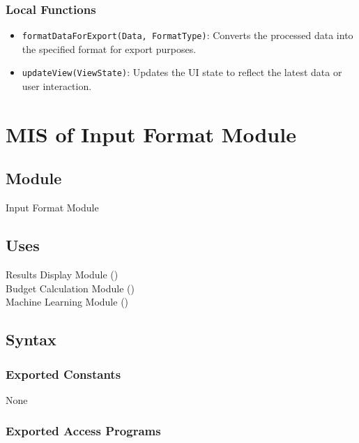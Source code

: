 \documentclass[12pt, titlepage]{article}
\begin{document}
\subsubsection{Local Functions}

\begin{itemize}
    \item \texttt{formatDataForExport(Data, FormatType)}: Converts the processed data into the specified format for export purposes.
    \item \texttt{updateView(ViewState)}: Updates the UI state to reflect the latest data or user interaction.
\end{itemize}

\newpage


\section{MIS of Input Format Module}\label{input_format_module}

\subsection{Module}

Input Format Module

\subsection{Uses}

Results Display Module ()\\
Budget Calculation Module ()\\
Machine Learning Module ()\\

\subsection{Syntax}

\subsubsection{Exported Constants}

None

\subsubsection{Exported Access Programs}
\end{document}
